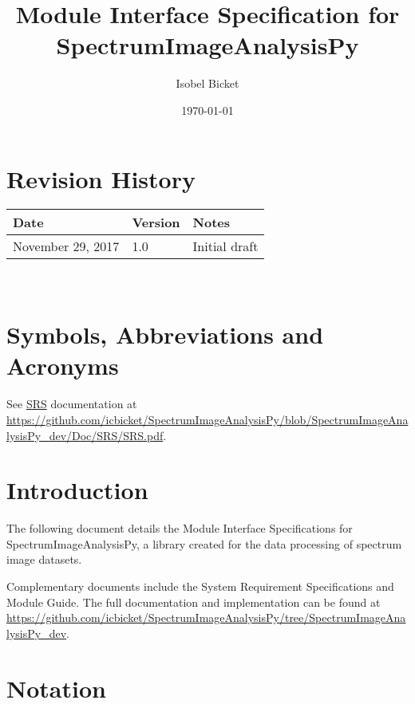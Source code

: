 \documentclass[12pt, titlepage]{article}
\newcommand{\progname}{SpectrumImageAnalysisPy}
\begin{document}
\label{doc:MIS}

\title{Module Interface Specification for \progname{}}

\author{Isobel Bicket}

\date{\today}

\maketitle


\section{Revision History}

\begin{tabularx}{\textwidth}{p{4cm}p{2cm}X}
\toprule {\bf Date} & {\bf Version} & {\bf Notes}\\
\midrule
	November 29, 2017 & 1.0 & Initial draft\\
\bottomrule
\end{tabularx}

~\newpage

\section{Symbols, Abbreviations and Acronyms}

See \hyperref[doc:SRS]{SRS} documentation at \url{https://github.com/icbicket/SpectrumImageAnalysisPy/blob/SpectrumImageAnalysisPy_dev/Doc/SRS/SRS.pdf}.

\newpage

\tableofcontents

\newpage


\section{Introduction}

The following document details the Module Interface Specifications for
\progname, a library created for the data processing of spectrum image datasets.

Complementary documents include the System Requirement Specifications
and Module Guide.  The full documentation and implementation can be
found at \url{https://github.com/icbicket/SpectrumImageAnalysisPy/tree/SpectrumImageAnalysisPy_dev}.

\section{Notation}
\end{document}
